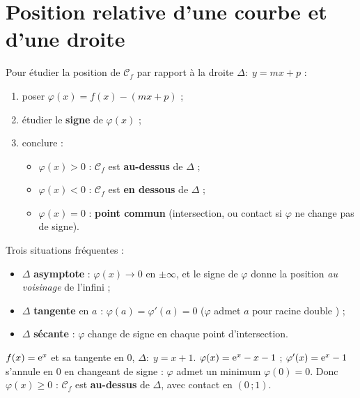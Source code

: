 \section{Position relative d'une courbe et d'une droite}

\begin{methode}
	Pour étudier la position de $\mathcal C_f$ par rapport à la droite
	$\Delta:\;y=mx+p$ :
	\begin{enumerate}
		\item poser $\varphi(x)=f(x)-(mx+p)$ ;
		\item étudier le \textbf{signe} de $\varphi(x)$ ;
		\item conclure :
		\begin{itemize}[label=\textbullet]
			\item $\varphi(x)>0$ : $\mathcal C_f$ est \textbf{au-dessus} de $\Delta$ ;
			\item $\varphi(x)<0$ : $\mathcal C_f$ est \textbf{en dessous} de $\Delta$ ;
			\item $\varphi(x)=0$ : \textbf{point commun} (intersection, ou contact
			si $\varphi$ ne change pas de signe).
		\end{itemize}
	\end{enumerate}
\end{methode}

\begin{attention}
	Trois situations fréquentes :
	\begin{itemize}[label=\textbullet]
		\item $\Delta$ \textbf{asymptote} : $\varphi(x)\to 0$ en $\pm\infty$, et
		le signe de $\varphi$ donne la position \emph{au voisinage} de l'infini ;
		\item $\Delta$ \textbf{tangente} en $a$ : $\varphi(a)=\varphi'(a)=0$
		($\varphi$ admet $a$ pour racine \og double \fg) ;
		\item $\Delta$ \textbf{sécante} : $\varphi$ change de signe en chaque
		point d'intersection.
	\end{itemize}
\end{attention}

\begin{exemple}
	$f(x)=\mathrm{e}^{x}$ et sa tangente en $0$, $\Delta:\;y=x+1$.
	$\varphi(x)=\mathrm{e}^{x}-x-1$ ; $\varphi'(x)=\mathrm{e}^{x}-1$ s'annule en $0$ en
	changeant de signe : $\varphi$ admet un minimum $\varphi(0)=0$. Donc
	$\varphi(x)\geq 0$ : $\mathcal C_f$ est \textbf{au-dessus} de $\Delta$, avec
	contact en $(0\,;1)$.
\end{exemple}

